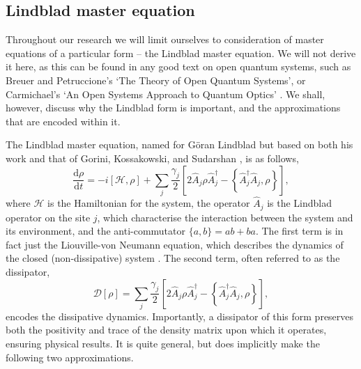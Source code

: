 \subsection{\label{sec:lindblad}Lindblad master equation}
Throughout our research we will limit ourselves to consideration of master equations of a particular form -- the Lindblad master equation. We will not derive it here, as this can be found in any good text on open quantum systems, such as Breuer and Petruccione's `The Theory of Open Quantum Systems', or Carmichael's `An Open Systems Approach to Quantum Optics' \cite{BP_TMQME,Carmichael_OSAQO}. We shall, however, discuss why the Lindblad form is important, and the approximations that are encoded within it. 

The Lindblad master equation, named for G\"{o}ran Lindblad but based on both his work and that of Gorini, Kossakowski, and Sudarshan \cite{Lindblad1976,Gorini1976}, is as follows,
\begin{equation}
	\frac{\mathrm{d}\rho}{\mathrm{d}t} = -i [\mathcal{H}, \rho] + \sum_{j} \frac{\gamma_{j}}{2} \left[ 2\hat{A}_{j} \rho \hat{A}_{j}^{\dagger} - \left\{\hat{A}_{j}^{\dagger}\hat{A}_{j}, \rho\right\}\right],
	\label{eq:oqs3-1}
\end{equation}
where \(\mathcal{H}\) is the Hamiltonian for the system, the operator \(\hat{A}_{j}\) is the Lindblad operator on the site \(j\), which characterise the interaction between the system and its environment, and the anti-commutator \(\{a, b\} = ab + ba\). The first term is in fact just the Liouville-von Neumann equation, which describes the dynamics of the closed (non-dissipative) system \cite{BP_LvN}. The second term, often referred to as the dissipator,
\begin{equation}
	\mathcal{D}[\rho] = \sum_{j}\frac{\gamma_{j}}{2}\left[2\hat{A}_{j}\rho\hat{A}_{j}^{\dagger} - \left\{\hat{A}_{j}^{\dagger}\hat{A}_{j}, \rho\right\}\right],
	\label{eq:oqs3-2}
\end{equation}
encodes the dissipative dynamics. Importantly, a dissipator of this form preserves both the positivity and trace of the density matrix upon which it operates, ensuring physical results. It is quite general, but does implicitly make the following two approximations.

